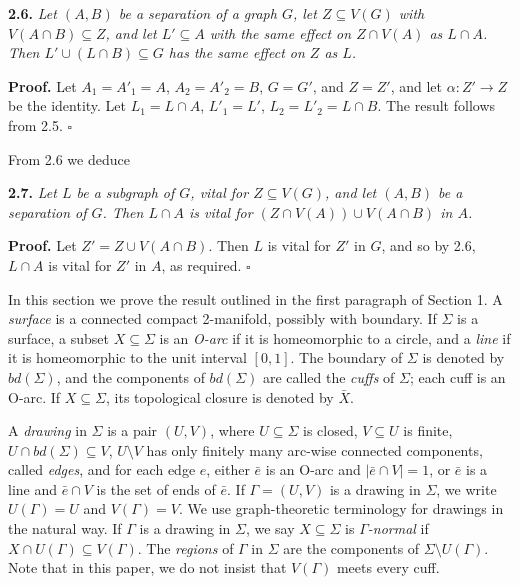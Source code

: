 \textbf{2.6.} \textit{Let $(A, B)$ be a separation of a graph $G$, let $Z \subseteq V(G)$ with $V(A \cap B) \subseteq Z$, and let $L' \subseteq A$ with the same effect on $Z \cap V(A)$ as $L \cap A$. Then $L' \cup (L \cap B) \subseteq G$ has the same effect on $Z$ as $L$.}

\textbf{Proof.} Let $A_1 = A'_1 = A$, $A_2 = A'_2 = B$, $G = G'$, and $Z = Z'$, and let $\alpha : Z' \to Z$ be the identity. Let $L_1 = L \cap A$, $L'_1 = L'$, $L_2 = L'_2 = L \cap B$. The result follows from 2.5. $\square$

From 2.6 we deduce

\textbf{2.7.} \textit{Let $L$ be a subgraph of $G$, vital for $Z \subseteq V(G)$, and let $(A, B)$ be a separation of $G$. Then $L \cap A$ is vital for $(Z \cap V(A)) \cup V(A \cap B)$ in $A$.}

\textbf{Proof.} Let $Z' = Z \cup V(A \cap B)$. Then $L$ is vital for $Z'$ in $G$, and so by 2.6, $L \cap A$ is vital for $Z'$ in $A$, as required. $\square$


In this section we prove the result outlined in the first paragraph of Section 1. A \textit{surface} is a connected compact 2-manifold, possibly with boundary. If $\Sigma$ is a surface, a subset $X \subseteq \Sigma$ is an \textit{O-arc} if it is homeomorphic to a circle, and a \textit{line} if it is homeomorphic to the unit interval $[0, 1]$. The boundary of $\Sigma$ is denoted by $bd(\Sigma)$, and the components of $bd(\Sigma)$ are called the \textit{cuffs} of $\Sigma$; each cuff is an O-arc. If $X \subseteq \Sigma$, its topological closure is denoted by $\bar{X}$.

A \textit{drawing} in $\Sigma$ is a pair $(U, V)$, where $U \subseteq \Sigma$ is closed, $V \subseteq U$ is finite, $U \cap bd(\Sigma) \subseteq V$, $U \setminus V$ has only finitely many arc-wise connected components, called \textit{edges}, and for each edge $e$, either $\bar{e}$ is an O-arc and $|\bar{e} \cap V| = 1$, or $\bar{e}$ is a line and $\bar{e} \cap V$ is the set of ends of $\bar{e}$. If $\Gamma = (U, V)$ is a drawing in $\Sigma$, we write $U(\Gamma) = U$ and $V(\Gamma) = V$. We use graph-theoretic terminology for drawings in the natural way. If $\Gamma$ is a drawing in $\Sigma$, we say $X \subseteq \Sigma$ is \textit{$\Gamma$-normal} if $X \cap U(\Gamma) \subseteq V(\Gamma)$. The \textit{regions} of $\Gamma$ in $\Sigma$ are the components of $\Sigma \setminus U(\Gamma)$. Note that in this paper, we do not insist that $V(\Gamma)$ meets every cuff.

